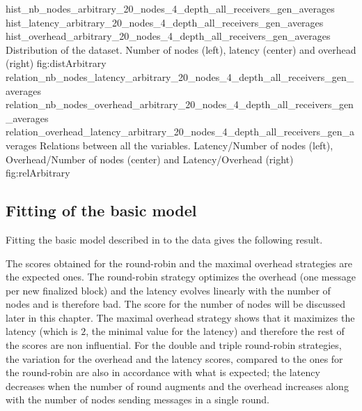 \triplefigure
    {hist_nb_nodes_arbitrary_20_nodes_4_depth_all_receivers_gen_averages}
    {hist_latency_arbitrary_20_nodes_4_depth_all_receivers_gen_averages}
    {hist_overhead_arbitrary_20_nodes_4_depth_all_receivers_gen_averages}
    {Distribution of the dataset. Number of nodes (left), latency (center)
    and overhead (right)}
    {fig:distArbitrary}
\triplefigure
    {relation_nb_nodes_latency_arbitrary_20_nodes_4_depth_all_receivers_gen_averages}
    {relation_nb_nodes_overhead_arbitrary_20_nodes_4_depth_all_receivers_gen_averages}
    {relation_overhead_latency_arbitrary_20_nodes_4_depth_all_receivers_gen_averages}
    {Relations between all the variables. Latency/Number of nodes (left),
    Overhead/Number of nodes (center) and Latency/Overhead (right)}
    {fig:relArbitrary}


\subsection{Fitting of the basic model}
Fitting the basic model described in  to the data gives the
following result.

\begin{table}[H]
\end{table}

The scores obtained for the round-robin and the maximal overhead strategies are
the expected ones. The round-robin strategy optimizes the overhead (one message
per new finalized block) and the latency evolves linearly with the number of
nodes and is therefore bad. The score for the number of nodes will be discussed
later in this chapter. The maximal overhead strategy shows that it maximizes the
latency (which is \(2\), the minimal value for the latency) and therefore the
rest of the scores are non influential.
For the double and triple round-robin strategies, the variation for the overhead
and the latency scores, compared to the ones for the round-robin are also in
accordance with what is expected; the latency decreases when the number of round
augments and the overhead increases along with the number of nodes sending
messages in a single round.
